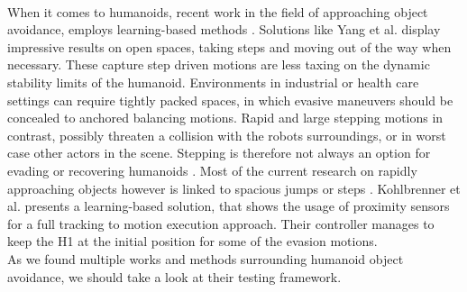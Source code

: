 \\
When it comes to humanoids, recent work in the field of approaching object avoidance, employs learning-based methods \cite{yang_2026,kohlbrenner_2026}.
Solutions like Yang et al. \cite{yang_2026} display impressive results on open spaces, taking steps and moving out of the way when necessary.
These capture step driven motions are less taxing on the dynamic stability limits of the humanoid.
Environments in industrial or health care settings can require tightly packed spaces, in which evasive maneuvers should be concealed to anchored balancing motions.
Rapid and large stepping motions in contrast, possibly threaten a collision with the robots surroundings, or in worst case other actors in the scene.
Stepping is therefore not always an option for evading or recovering humanoids \cite{huang_2022}.
Most of the current research on rapidly approaching objects however is linked to spacious jumps or steps \cite{yang_2026,zhao_2026}.
Kohlbrenner et al. \cite{kohlbrenner_2026} presents a learning-based solution, that shows the usage of proximity sensors for a full tracking to motion execution approach.
Their controller manages to keep the H1 at the initial position for some of the evasion motions.
\\
As we found multiple works and methods surrounding humanoid object avoidance, we should take a look at their testing framework.

